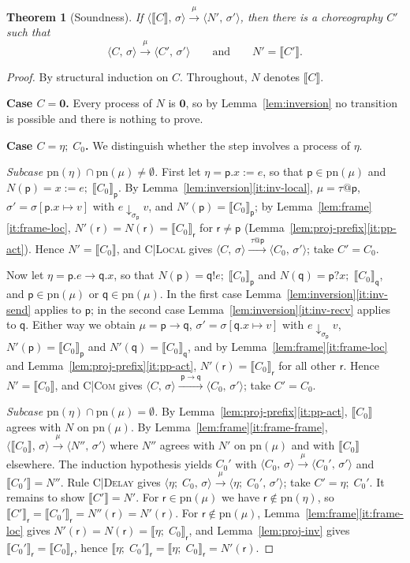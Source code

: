 \documentclass[11pt]{article}
\makeatletter
\theoremstyle{plain}
\newtheorem{theorem}{Theorem}[section]
\theoremstyle{definition}
\theoremstyle{remark}
\newcommand{\nil}{\mathbf{0}}
\newcommand{\seq}{;\;}
\newcommand{\pp}{\mathsf{p}}
\newcommand{\qq}{\mathsf{q}}
\newcommand{\rr}{\mathsf{r}}
\newcommand{\pn}{\mathrm{pn}}
\newcommand{\eval}[3]{#1 \downarrow_{#2} #3}
\newcommand{\conf}[2]{\langle #1,\, #2\rangle}
\newcommand{\lto}[1]{\xrightarrow{\;#1\;}}
\newcommand{\proj}[2]{\llbracket #1 \rrbracket_{#2}}
\newcommand{\projn}[1]{\llbracket #1 \rrbracket}
\newcommand{\tauat}[1]{\tau\mathord{@}#1}
\newcommand{\upd}[3]{#1[#2 \mapsto #3]}
\newcommand{\rn}[1]{{\normalfont\scshape #1}}
\newcommand{\case}[1]{\medskip\noindent\textbf{Case #1.}\;}
\newcommand{\subcase}[1]{\smallskip\noindent\textit{Subcase #1.}\;}
\makeatother
\begin{document}
\begin{theorem}[Soundness]\label{thm:soundness}
  If $\conf{\projn{C}}{\sigma}\lto{\mu}\conf{N'}{\sigma'}$, then there is a
  choreography $C'$ such that
  \[
    \conf{C}{\sigma}\lto{\mu}\conf{C'}{\sigma'}
    \qquad\text{and}\qquad
    N' = \projn{C'}.
  \]
\end{theorem}
\begin{proof}
  By structural induction on $C$.  Throughout, $N$ denotes $\projn{C}$.

  \case{$C = \nil$}
  Every process of $N$ is $\nil$, so by Lemma~\ref{lem:inversion} no
  transition is possible and there is nothing to prove.

  \case{$C = \eta\seq C_0$}
  We distinguish whether the step involves a process of $\eta$.

  \subcase{$\pn(\eta)\cap\pn(\mu) \neq \emptyset$}
  First let $\eta = \pp.x := e$, so that $\pp\in\pn(\mu)$ and
  $N(\pp) = x := e\seq\proj{C_0}{\pp}$.  By
  Lemma~\ref{lem:inversion}\ref{it:inv-local}, $\mu = \tauat\pp$,
  $\sigma' = \upd{\sigma}{\pp.x}{v}$ with $\eval{e}{\sigma_\pp}{v}$, and
  $N'(\pp) = \proj{C_0}{\pp}$; by Lemma~\ref{lem:frame}\ref{it:frame-loc},
  $N'(\rr) = N(\rr) = \proj{C_0}{\rr}$ for $\rr\neq\pp$
  (Lemma~\ref{lem:proj-prefix}\ref{it:pp-act}).  Hence $N' = \projn{C_0}$,
  and \rn{C|Local} gives $\conf{C}{\sigma}\lto{\tauat\pp}\conf{C_0}{\sigma'}$;
  take $C' = C_0$.

  Now let $\eta = \pp.e\to\qq.x$, so that $N(\pp) = \qq!e\seq\proj{C_0}{\pp}$
  and $N(\qq) = \pp?x\seq\proj{C_0}{\qq}$, and $\pp\in\pn(\mu)$ or
  $\qq\in\pn(\mu)$.  In the first case Lemma~\ref{lem:inversion}\ref{it:inv-send}
  applies to $\pp$; in the second case Lemma~\ref{lem:inversion}\ref{it:inv-recv}
  applies to $\qq$.  Either way we obtain $\mu = \pp\to\qq$,
  $\sigma' = \upd{\sigma}{\qq.x}{v}$ with $\eval{e}{\sigma_\pp}{v}$,
  $N'(\pp) = \proj{C_0}{\pp}$ and $N'(\qq) = \proj{C_0}{\qq}$, and by
  Lemma~\ref{lem:frame}\ref{it:frame-loc} and
  Lemma~\ref{lem:proj-prefix}\ref{it:pp-act}, $N'(\rr) = \proj{C_0}{\rr}$ for
  all other $\rr$.  Hence $N' = \projn{C_0}$, and \rn{C|Com} gives
  $\conf{C}{\sigma}\lto{\pp\to\qq}\conf{C_0}{\sigma'}$; take $C' = C_0$.

  \subcase{$\pn(\eta)\cap\pn(\mu) = \emptyset$}
  By Lemma~\ref{lem:proj-prefix}\ref{it:pp-act}, $\projn{C_0}$ agrees with
  $N$ on $\pn(\mu)$.  By Lemma~\ref{lem:frame}\ref{it:frame-frame},
  $\conf{\projn{C_0}}{\sigma}\lto{\mu}\conf{N''}{\sigma'}$ where $N''$ agrees
  with $N'$ on $\pn(\mu)$ and with $\projn{C_0}$ elsewhere.  The induction
  hypothesis yields $C_0'$ with $\conf{C_0}{\sigma}\lto{\mu}\conf{C_0'}{\sigma'}$
  and $\projn{C_0'} = N''$.  Rule \rn{C|Delay} gives
  $\conf{\eta\seq C_0}{\sigma}\lto{\mu}\conf{\eta\seq C_0'}{\sigma'}$; take
  $C' = \eta\seq C_0'$.  It remains to show $\projn{C'} = N'$.  For
  $\rr\in\pn(\mu)$ we have $\rr\notin\pn(\eta)$, so
  $\proj{C'}{\rr} = \proj{C_0'}{\rr} = N''(\rr) = N'(\rr)$.  For
  $\rr\notin\pn(\mu)$, Lemma~\ref{lem:frame}\ref{it:frame-loc} gives
  $N'(\rr) = N(\rr) = \proj{\eta\seq C_0}{\rr}$, and Lemma~\ref{lem:proj-inv}
  gives $\proj{C_0'}{\rr} = \proj{C_0}{\rr}$, hence
  $\proj{\eta\seq C_0'}{\rr} = \proj{\eta\seq C_0}{\rr} = N'(\rr)$.


\end{proof}
\end{document}
